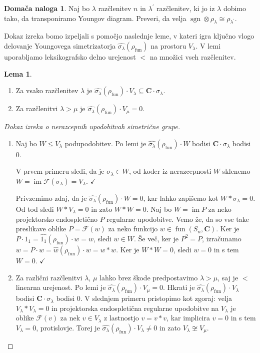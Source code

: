 \documentclass[11pt]{book}
\def\CC{\mathbf{C}}
\def\Fcal{\mathcal{F}}
\def\youngsym{\sigma_{\lambda}}
\DeclareMathOperator\image{im}
\DeclareMathOperator\sgn{sgn}
\DeclareMathOperator\fun{fun}
\def\kljuka{$\checkmark$}
\theoremstyle{definition}
\theoremstyle{zgled}
\theoremstyle{odprtproblem}
\theoremstyle{domacanaloga}
\newtheorem*{domacanaloga}{Domača naloga}
\newenvironment{dokaz}
    {\color{siva}\begin{proof}}
    {\end{proof}}
\theoremstyle{izrek}
\newtheorem*{lema}{Lema}
\begin{document}
\begin{domacanaloga}
    Naj bo $\lambda$ razčlenitev $n$ in $\lambda^\prime$ razčlenitev, ki jo iz $\lambda$ dobimo tako, da transponiramo Youngov diagram. Preveri, da velja $\sgn \otimes \rho_{\lambda} \cong \rho_{\lambda^\prime}$.
\end{domacanaloga}        

Dokaz izreka bomo izpeljali s pomočjo naslednje leme, v kateri igra ključno vlogo delovanje Youngovega simetrizatorja $\widehat{\youngsym}(\rho_{\fun})$ na prostoru $V_{\lambda}$. V lemi uporabljamo leksikografsko delno urejenost $<$ na množici vseh razčlenitev. 

\begin{lema} \leavevmode
\begin{enumerate}
    \item Za vsako razčlenitev $\lambda$ je $\widehat{\youngsym}(\rho_{\fun}) \cdot V_{\lambda} \subseteq \CC \cdot \youngsym$.
    \item Za razčlenitvi $\lambda > \mu$ je $\widehat{\youngsym}(\rho_{\fun}) \cdot V_{\mu} = 0$.
\end{enumerate}
\end{lema}

\begin{dokaz}[Dokaz izreka o nerazcepnih upodobitvah simetrične grupe] \leavevmode
\begin{enumerate}
    \item Naj bo $W \leq V_{\lambda}$ podupodobitev. Po lemi je $\widehat{\youngsym}(\rho_{\fun}) \cdot W$ bodisi $\CC \cdot \youngsym$ bodisi $0$. 
    
    V prvem primeru sledi, da je $\youngsym \in W$, od koder iz nerazcepnosti $W$ sklenemo $W = \image \Fcal(\youngsym) = V_{\lambda}$. \kljuka
    
    Privzemimo zdaj, da je $\widehat{\youngsym}(\rho_{\fun}) \cdot W = 0$, kar lahko zapišemo kot $W * \youngsym = 0$. Od tod sledi $W * V_{\lambda} = 0$ in zato $W * W = 0$. Naj bo $W = \image P$ za neko projektorsko endospletično $P$ regularne upodobitve. Vemo že, da so vse take preslikave oblike $P = \Fcal(w)$ za neko funkcijo $w \in \fun(S_n, \CC)$. Ker je $P \cdot 1_1 = \widehat{1_1}(\rho_{\fun}) \cdot w = w$, sledi $w \in W$. Še več, ker je $P^2 = P$, izračunamo $w = P \cdot w = \widehat{w}(\rho_{\fun}) \cdot w = w * w$. Ker je $W * W = 0$, sledi $w = 0$ in s tem $W = 0$. \kljuka

    \item Za različni razčlenitvi $\lambda$, $\mu$ lahko brez škode predpostavimo $\lambda > \mu$, saj je $<$ linearna urejenost. Po lemi je $\widehat{\youngsym}(\rho_{\fun}) \cdot V_{\mu} = 0$. Hkrati je $\widehat{\youngsym}(\rho_{\fun}) \cdot V_{\lambda}$ bodisi $\CC \cdot \youngsym$ bodisi $0$. V slednjem primeru pristopimo kot zgoraj: velja $V_{\lambda} * V_{\lambda} = 0$ in projektorska endospletična regularne upodobitve na $V_{\lambda}$ je oblike $\Fcal(v)$ za nek $v \in V_{\lambda}$ z lastnostjo $v = v * v$, kar implicira $v = 0$ in s tem $V_{\lambda} = 0$, protislovje. Torej je $\widehat{\youngsym}(\rho_{\fun}) \cdot V_{\lambda} \neq 0$ in zato $V_{\lambda} \not\cong V_{\mu}$.
\end{enumerate}
\end{dokaz}
\end{document}
